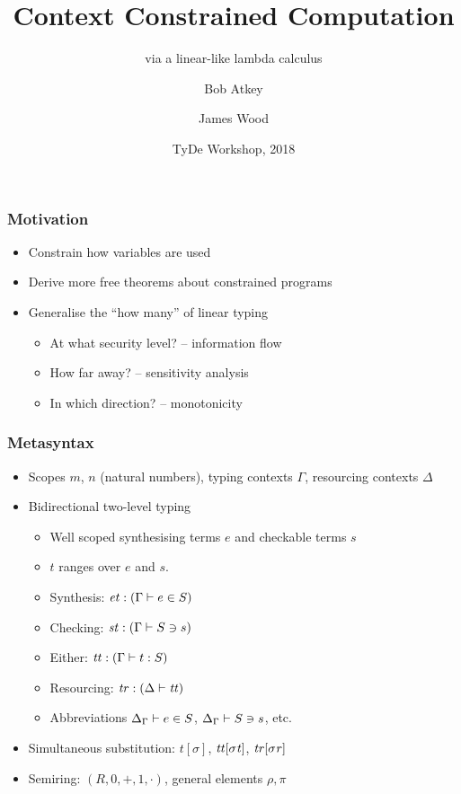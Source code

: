 \documentclass{beamer}
\title{Context Constrained Computation}
\subtitle{via a linear-like lambda calculus}
\author{Bob Atkey\inst{1} \and James Wood\inst{1}}
\institute{\inst{1}University of Strathclyde}
\date{TyDe Workshop, 2018}
\begin{document}
  \frame{\titlepage}
  \begin{frame}
    \frametitle{Motivation}

    \begin{itemize}
    \item Constrain how variables are used
    \item Derive more free theorems about constrained programs
    \item Generalise the ``how many'' of linear typing \pause
      \begin{itemize}
      \item At what security level? -- information flow \pause
      \item How far away? -- sensitivity analysis \pause
      \item In which direction? -- monotonicity
      \end{itemize}
    \end{itemize}
  \end{frame}
  \begin{frame}
    \frametitle{Metasyntax}
    \begin{itemize}
    \item<1-> Scopes $m$, $n$ (natural numbers), typing contexts $\Gamma$,
      resourcing contexts $\Delta$
    \item<2-> Bidirectional two-level typing
      \begin{itemize}
      \item<2-> Well scoped synthesising terms $e$ and checkable terms $s$
      \item<2-> $t$ ranges over $e$ and $s$.
      \item<3-> Synthesis: $\mathit{et} : (\Gamma \vdash e \in S)$
      \item<3-> Checking: $\mathit{st} : (\Gamma \vdash S \ni s)$
      \item<4-> Either: $\mathit{tt} : (\Gamma \vdash t : S)$
      \item<5-> Resourcing: $\mathit{tr} : (\Delta \vdash \mathit{tt})$
      \item<6-> Abbreviations ${\Delta}_{\Gamma} \vdash e \in S$,
        ${\Delta}_{\Gamma} \vdash S \ni s$, etc.
      \end{itemize}
    \item<7-> Simultaneous substitution: $t[\sigma]$, $\mathit{tt}[\mathit{\sigma t}]$,
      $\mathit{tr}[\mathit{\sigma r}]$
    \item<8-> Semiring: $(R, 0, +, 1, \cdot)$, general elements $\rho, \pi$
    \end{itemize}
  \end{frame}
\end{document}
